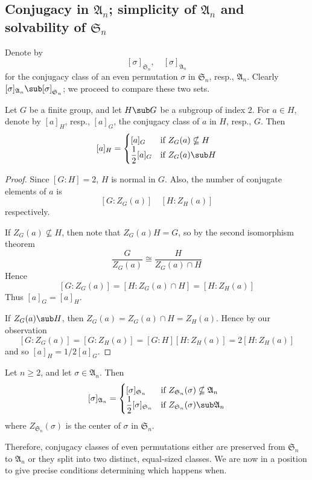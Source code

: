 \subsection{Conjugacy in $\mathfrak{A}_n$; simplicity of $\mathfrak{A}_n$ and solvability of $\mathfrak{S}_n$}
Denote by 
\[[\sigma]_{\mathfrak{S}_n},\quad [\sigma]_{\mathfrak{A}_n}\] 
for the conjugacy class of an even permutation $\sigma$ in $\mathfrak{S}_n$, resp., $\mathfrak{A}_n$. Clearly $[\sigma]_{\mathfrak{A}_n}\sub [\sigma]_{\mathfrak{S}_n}$; we proceed to compare these two sets.
\begin{proposition}
Let $G$ be a finite group, and let $H\sub G$ be a subgroup of index $2$. For
$a\in H$, denote by $[a]_H$, resp., $[a]_G$, the conjugacy class of $a$ in $H$, resp., $G$. Then
\[[a]_H=\begin{cases}
[a]_G&\text{if }Z_G(a)\nsubseteq H\\
\dfrac{1}{2}[a]_G&\text{if }Z_G(a)\sub H
\end{cases}\]
\end{proposition}
\begin{proof}
Since $[G:H]=2$, $H$ is normal in $G$. Also, the number of conjugate elements of $a$ is 
\[[G:Z_G(a)]\quad [H:Z_H(a)]\]
respectively.\par
If $Z_G(a)\nsubseteq H$, then note that $Z_G(a)H=G$, so by the second isomorphism theorem
\[\frac{G}{Z_G(a)}\cong\frac{H}{Z_G(a)\cap H}\]
Hence
\[[G:Z_G(a)]=[H:Z_G(a)\cap H]=[H:Z_H(a)]\]
Thus $[a]_G=[a]_H$.\par
If $Z_G(a)\sub H$, then $Z_G(a)=Z_G(a)\cap H=Z_H(a)$. Hence by our observation
\[[G:Z_G(a)]=[G:Z_H(a)]=[G:H][H:Z_H(a)]=2[H:Z_H(a)]\]
and so $[a]_H=1/2[a]_G$.
\end{proof}
\begin{corollary}\label{conjugate in A_n}
Let $n\geq 2$, and let $\sigma\in\mathfrak{A}_n$. Then
\[[\sigma]_{\mathfrak{A}_n}=\begin{cases}
[\sigma]_{\mathfrak{S}_n}&\text{if }Z_{\mathfrak{S}_n}(\sigma)\nsubseteq\mathfrak{A}_n\\
\dfrac{1}{2}[\sigma]_{\mathfrak{S}_n}&\text{if }Z_{\mathfrak{S}_n}(\sigma)\sub\mathfrak{A}_n
\end{cases}\]
where $Z_{\mathfrak{S}_n}(\sigma)$ is the center of $\sigma$ in $\mathfrak{S}_n$.
\end{corollary}
Therefore, conjugacy classes of even permutations either are preserved from $\mathfrak{S}_n$ to $\mathfrak{A}_n$ or they split into two distinct, equal-sized classes. We are now in a position to give precise conditions determining which happens when.
